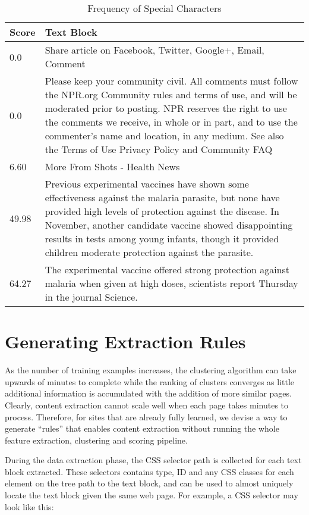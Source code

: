 \documentclass{acm_proc_article-sp}
\begin{document}
\begin{table}
\caption{Frequency of Special Characters}
\begin{tabular}{  p{0.8cm}  p{6.7cm}  }
Score & Text Block \\
\hline
0.0 & Share article on Facebook, Twitter, Google+, Email, Comment \\
\hline
0.0 & Please keep your community civil. All comments must follow the  NPR.org Community rules  and  terms of use, and will be moderated prior to posting. NPR reserves the right to use the comments we receive, in whole or in part, and to use the commenter's name and location, in any medium. See also the  Terms of Use  Privacy Policy  and  Community FAQ \\
\hline
6.60 & More From Shots - Health News \\
\hline
49.98 & Previous experimental vaccines have shown some effectiveness against the malaria parasite, but none have provided high levels of protection against the disease. In November, another candidate vaccine showed  disappointing results  in tests among young infants, though it provided children moderate protection against the parasite. \\
\hline
64.27 & The experimental vaccine offered strong protection against malaria when given at high doses, scientists report Thursday in the journal Science. \\
\end{tabular}
\end{table}

\section{Generating Extraction Rules}

As the number of training examples increases, the clustering algorithm can take upwards of minutes to complete while the ranking of clusters converges as little additional information is accumulated with the addition of more similar pages. Clearly, content extraction cannot scale well when each page takes minutes to process. Therefore, for sites that are already fully learned, we devise a way to generate ``rules'' that enables content extraction without running the whole feature extraction, clustering and scoring pipeline.

During the data extraction phase, the CSS selector path is collected for each text block extracted. These selectors contains type, ID and any CSS classes for each element on the tree path to the text block, and can be used to almost uniquely locate the text block given the same web page. For example, a CSS selector may look like this:
\end{document}
